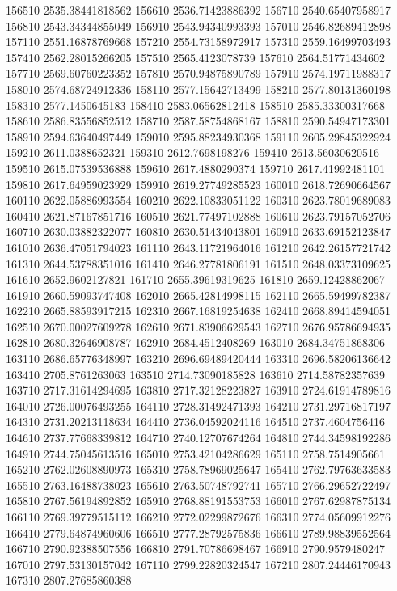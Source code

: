{156510 2535.38441818562
156610 2536.71423886392
156710 2540.65407958917
156810 2543.34344855049
156910 2543.94340993393
157010 2546.82689412898
157110 2551.16878769668
157210 2554.73158972917
157310 2559.16499703493
157410 2562.28015266205
157510 2565.4123078739
157610 2564.51771434602
157710 2569.60760223352
157810 2570.94875890789
157910 2574.19711988317
158010 2574.68724912336
158110 2577.15642713499
158210 2577.80131360198
158310 2577.1450645183
158410 2583.06562812418
158510 2585.33300317668
158610 2586.83556852512
158710 2587.58754868167
158810 2590.54947173301
158910 2594.63640497449
159010 2595.88234930368
159110 2605.29845322924
159210 2611.0388652321
159310 2612.7698198276
159410 2613.56030620516
159510 2615.07539536888
159610 2617.4880290374
159710 2617.41992481101
159810 2617.64959023929
159910 2619.27749285523
160010 2618.72690664567
160110 2622.05886993554
160210 2622.10833051122
160310 2623.78019689083
160410 2621.87167851716
160510 2621.77497102888
160610 2623.79157052706
160710 2630.03882322077
160810 2630.51434043801
160910 2633.69152123847
161010 2636.47051794023
161110 2643.11721964016
161210 2642.26157721742
161310 2644.53788351016
161410 2646.27781806191
161510 2648.03373109625
161610 2652.9602127821
161710 2655.39619319625
161810 2659.12428862067
161910 2660.59093747408
162010 2665.42814998115
162110 2665.59499782387
162210 2665.88593917215
162310 2667.16819254638
162410 2668.89414594051
162510 2670.00027609278
162610 2671.83906629543
162710 2676.95786694935
162810 2680.32646908787
162910 2684.4512408269
163010 2684.34751868306
163110 2686.65776348997
163210 2696.69489420444
163310 2696.58206136642
163410 2705.8761263063
163510 2714.73090185828
163610 2714.58782357639
163710 2717.31614294695
163810 2717.32128223827
163910 2724.61914789816
164010 2726.00076493255
164110 2728.31492471393
164210 2731.29716817197
164310 2731.20213118634
164410 2736.04592024116
164510 2737.4604756416
164610 2737.77668339812
164710 2740.12707674264
164810 2744.34598192286
164910 2744.75045613516
165010 2753.42104286629
165110 2758.7514905661
165210 2762.02608890973
165310 2758.78969025647
165410 2762.79763633583
165510 2763.16488738023
165610 2763.50748792741
165710 2766.29652722497
165810 2767.56194892852
165910 2768.88191553753
166010 2767.62987875134
166110 2769.39779515112
166210 2772.02299872676
166310 2774.05609912276
166410 2779.64874960606
166510 2777.28792575836
166610 2789.98839552564
166710 2790.92388507556
166810 2791.70786698467
166910 2790.9579480247
167010 2797.53130157042
167110 2799.22820324547
167210 2807.24446170943
167310 2807.27685860388
}
